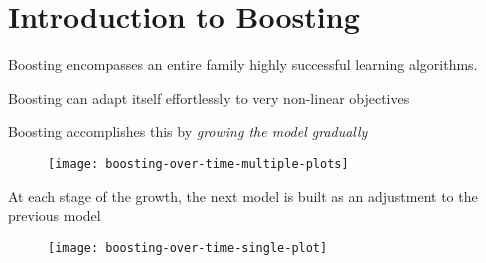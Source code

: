 \section{Introduction to Boosting}
%
\begin{frame}
  Boosting encompasses an entire family highly successful learning algorithms.
\end{frame}
%
\begin{frame}
Boosting can adapt itself effortlessly to very non-linear objectives
\end{frame}
%
\begin{frame}
Boosting accomplishes this by \textit{growing the model gradually}
  \begin{figure}
    \texttt{[image: boosting-over-time-multiple-plots]}
  \end{figure}
\end{frame}
%
\begin{frame}
At each stage of the growth, the next model is built as an adjustment to the previous model
  \begin{figure}
    \texttt{[image: boosting-over-time-single-plot]}
  \end{figure}
\end{frame}
%
